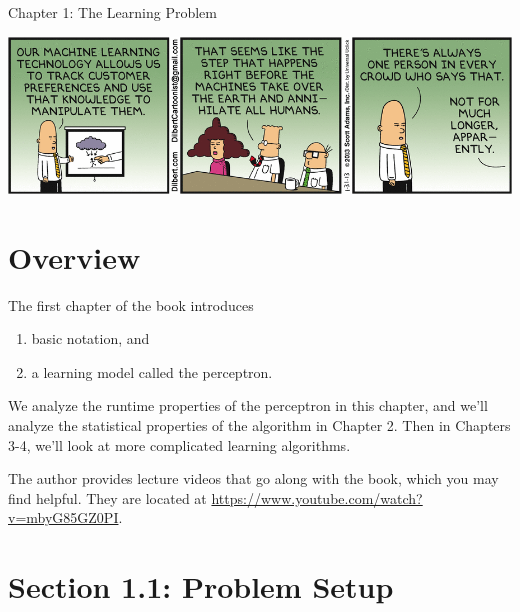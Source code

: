 \documentclass[10pt]{article}
\theoremstyle{definition}
\newcommand{\ignore}[1]{}
\begin{document}
\begin{center}
{
\Huge
Chapter 1: The Learning Problem
}

\end{center}

\begin{center}
\includegraphics[width=\textwidth]{dilbert}
\end{center}

\ignore{
Exercise 1.1, 1.2, 1.3, 1.5, 1.6

Memorize the Hoefding Inequality

Exercise 1.11?

Exercise 1.12, 1.13?

Problem 1.2?
}


\section{Overview}

The first chapter of the book introduces
\begin{enumerate}
    \item basic notation, and
    \item a learning model called the perceptron.
\end{enumerate}
We analyze the runtime properties of the perceptron in this chapter,
and we'll analyze the statistical properties of the algorithm in Chapter 2.
Then in Chapters 3-4, we'll look at more complicated learning algorithms.


The author provides lecture videos that go along with the book, which you may find helpful.
They are located at
\url{https://www.youtube.com/watch?v=mbyG85GZ0PI}.

\newpage
\section{Section 1.1: Problem Setup}
\end{document}
